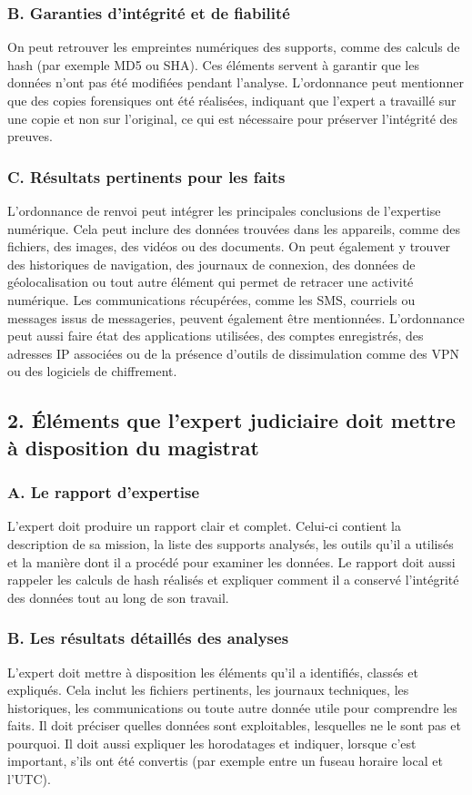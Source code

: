 \documentclass[12pt,a4paper]{report}
\begin{document}
\subsubsection*{B. Garanties d'intégrité et de fiabilité}
On peut retrouver les empreintes numériques des supports, comme des calculs de hash (par exemple MD5 ou SHA). Ces éléments servent à garantir que les données n'ont pas été modifiées pendant l'analyse. L'ordonnance peut mentionner que des copies forensiques ont été réalisées, indiquant que l'expert a travaillé sur une copie et non sur l'original, ce qui est nécessaire pour préserver l'intégrité des preuves.

\subsubsection*{C. Résultats pertinents pour les faits}
L'ordonnance de renvoi peut intégrer les principales conclusions de l'expertise numérique. Cela peut inclure des données trouvées dans les appareils, comme des fichiers, des images, des vidéos ou des documents. On peut également y trouver des historiques de navigation, des journaux de connexion, des données de géolocalisation ou tout autre élément qui permet de retracer une activité numérique. Les communications récupérées, comme les SMS, courriels ou messages issus de messageries, peuvent également être mentionnées. L'ordonnance peut aussi faire état des applications utilisées, des comptes enregistrés, des adresses IP associées ou de la présence d'outils de dissimulation comme des VPN ou des logiciels de chiffrement.

\subsection*{2. Éléments que l'expert judiciaire doit mettre à disposition du magistrat}

\subsubsection*{A. Le rapport d'expertise}
L'expert doit produire un rapport clair et complet. Celui-ci contient la description de sa mission, la liste des supports analysés, les outils qu'il a utilisés et la manière dont il a procédé pour examiner les données. Le rapport doit aussi rappeler les calculs de hash réalisés et expliquer comment il a conservé l'intégrité des données tout au long de son travail.

\subsubsection*{B. Les résultats détaillés des analyses}
L'expert doit mettre à disposition les éléments qu'il a identifiés, classés et expliqués. Cela inclut les fichiers pertinents, les journaux techniques, les historiques, les communications ou toute autre donnée utile pour comprendre les faits. Il doit préciser quelles données sont exploitables, lesquelles ne le sont pas et pourquoi. Il doit aussi expliquer les horodatages et indiquer, lorsque c'est important, s'ils ont été convertis (par exemple entre un fuseau horaire local et l'UTC).
\end{document}
